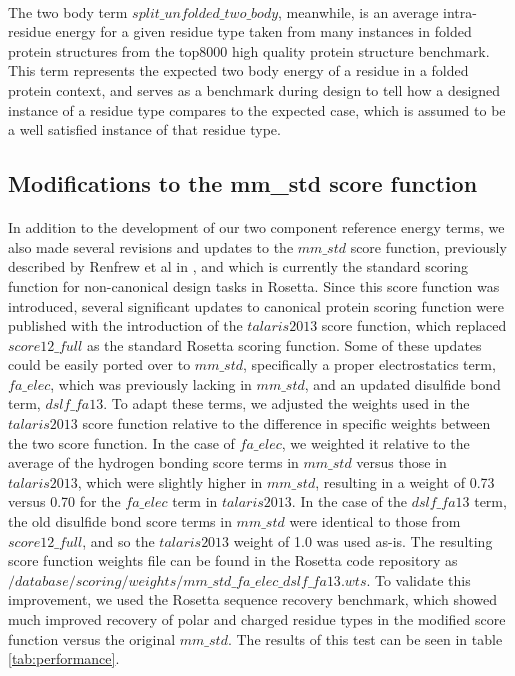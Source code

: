 \paragraph{}
The two body term $split\_unfolded\_two\_body$, meanwhile, is an average intra-residue energy for a given residue type taken from many instances in folded protein structures from the top8000 high quality protein structure benchmark\cite{lovell_structure_2003}.
This term represents the expected two body energy of a residue in a folded protein context, and serves as a benchmark during design to tell how a designed instance of a residue type compares to the expected case, which is assumed to be a well satisfied instance of that residue type.


\subsection{Modifications to the mm\_std score function}
\paragraph{}
In addition to the development of our two component reference energy terms, we also made several revisions and updates to the $mm\_std$ score function, previously described by Renfrew et al in \cite{renfrew_incorporation_2012}, and which is currently the standard scoring function for non-canonical design tasks in Rosetta.
Since this score function was introduced, several significant updates to canonical protein scoring function were published with the introduction of the $talaris2013$ score function, which replaced $score12\_full$ as the standard Rosetta scoring function\cite{leaver-fay_chapter_2013}.
Some of these updates could be easily ported over to $mm\_std$, specifically a proper electrostatics term, $fa\_elec$, which was previously lacking in $mm\_std$, and an updated disulfide bond term, $dslf\_fa13$.
To adapt these terms, we adjusted the weights used in the $talaris2013$ score function relative to the difference in specific weights between the two score function.
In the case of $fa\_elec$, we weighted it relative to the average of the hydrogen bonding score terms in $mm\_std$ versus those in $talaris2013$, which were slightly higher in $mm\_std$, resulting in a weight of 0.73 versus 0.70 for the $fa\_elec$ term in $talaris2013$.
In the case of the $dslf\_fa13$ term, the old disulfide bond score terms in $mm\_std$ were identical to those from $score12\_full$, and so the $talaris2013$ weight of 1.0 was used as-is.
The resulting score function weights file can be found in the Rosetta code repository as $/database/scoring/weights/mm\_std\_fa\_elec\_dslf\_fa13.wts$.
To validate this improvement, we used the Rosetta sequence recovery benchmark, which showed much improved recovery of polar and charged residue types in the modified score function versus the original $mm\_std$.
The results of this test can be seen in table \ref{tab:performance}.


